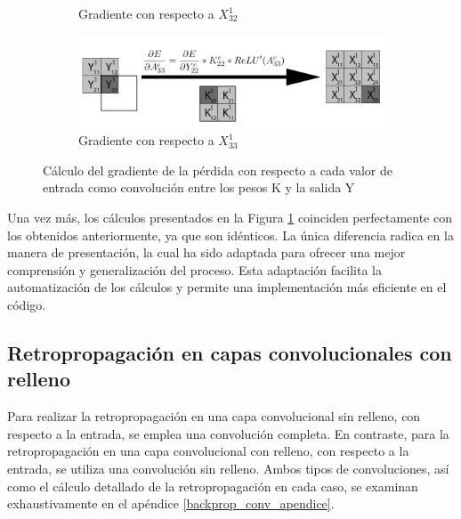 \begin{figure}[H]
\begin{subfigure}{.5\textwidth}
		\caption{Gradiente con respecto a $X^1_{32}$}
	\end{subfigure}
	\vspace{5mm}
	\begin{subfigure}{.5\textwidth}
		\hspace{-25mm}
		\includegraphics[width=1.4\linewidth]{imagenes/conv_back_entrada_9.jpg}  
		\caption{Gradiente con respecto a $X^1_{33}$}
	\end{subfigure}
	\caption{Cálculo del gradiente de la pérdida con respecto a cada valor de entrada como convolución entre los pesos K y la salida Y}
	\label{fig:conv_backprop_como_convolucion_Y_W}
\end{figure}

Una vez más, los cálculos presentados en la Figura \ref{fig:conv_backprop_como_convolucion_Y_W} coinciden perfectamente con los obtenidos anteriormente, ya que son idénticos. La única diferencia radica en la manera de presentación, la cual ha sido adaptada para ofrecer una mejor comprensión y generalización del proceso. Esta adaptación facilita la automatización de los cálculos y permite una implementación más eficiente en el código.


\subsection{Retropropagación en capas convolucionales con relleno}

Para realizar la retropropagación en una capa convolucional sin relleno, con respecto a la entrada, se emplea una convolución completa. En contraste, para la retropropagación en una capa convolucional con relleno, con respecto a la entrada, se utiliza una convolución sin relleno. Ambos tipos de convoluciones, así como el cálculo detallado de la retropropagación en cada caso, se examinan exhaustivamente en el apéndice \ref{backprop_conv_apendice}.

